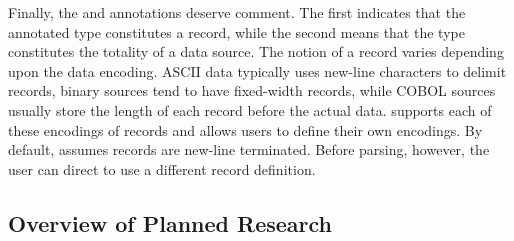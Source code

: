 \documentclass[11pt]{article}
\begin{document}

% 


% 


Finally, the  and  annotations deserve comment.  The first
indicates that the annotated type constitutes a record,
while the second means that the type constitutes the totality of a data source.  
The notion of a record varies depending upon the data encoding.  
ASCII data typically uses new-line characters to delimit 
records, binary sources tend to have fixed-width records, while 
COBOL sources usually store the length of each record before the actual data.
\pads{} supports each of these encodings of records and allows users to define
their own encodings.  By default, \pads{} assumes records are new-line terminated.
Before parsing, however, the user can direct \pads{} to use a different record
definition.



\subsection{Overview of Planned Research}
\label{ssec:sow}
\end{document}
